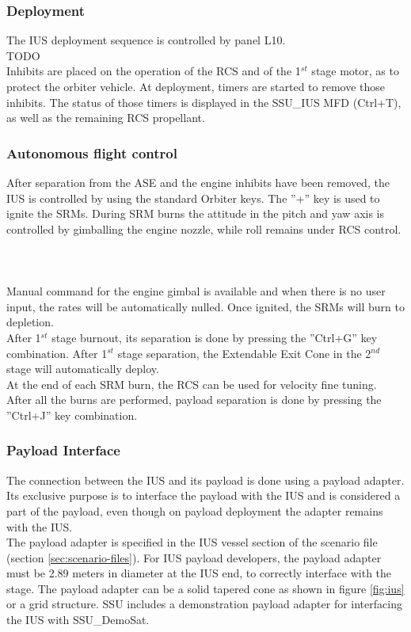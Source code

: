 \documentclass[Space_Shuttle_Ultra_Manual.tex]{subfiles}
\begin{document}
\begin{multicols*}{2}
\subsubsection{Deployment}
The IUS deployment sequence is controlled by panel L10.
\\
TODO
\\
Inhibits are placed on the operation of the RCS and of the 1$^{st}$ stage motor, as to protect the orbiter vehicle. At deployment, timers are started to remove those inhibits. The status of those timers is displayed in the SSU\_IUS MFD (Ctrl+T), as well as the remaining RCS propellant.

\subsubsection{Autonomous flight control}
After separation from the ASE and the engine inhibits have been removed, the IUS is controlled by using the standard Orbiter keys. The ''+'' key is used to ignite the SRMs. During SRM burns the attitude in the pitch and yaw axis is controlled by gimballing the engine nozzle, while roll remains under RCS control.
\\
\\
\\
\\
Manual command for the engine gimbal is available and when there is no user input, the rates will be automatically nulled. Once ignited, the SRMs will burn to depletion.\\
After 1$^{st}$ stage burnout, its separation is done by pressing the ''Ctrl+G'' key combination. After 1$^{st}$ stage separation, the Extendable Exit Cone in the 2$^{nd}$ stage will automatically deploy.\\
At the end of each SRM burn, the RCS can be used for velocity fine tuning.\\
After all the burns are performed, payload separation is done by pressing the ''Ctrl+J'' key combination.

\subsubsection{Payload Interface}
The connection between the IUS and its payload is done using a payload adapter. Its exclusive purpose is to interface the payload with the IUS and is considered a part of the payload, even though on payload deployment the adapter remains with the IUS.\\
The payload adapter is specified in the IUS vessel section of the scenario file (section \ref{sec:scenario-files}).
For IUS payload developers, the payload adapter must be 2.89 meters in diameter at the IUS end, to correctly interface with the stage. The payload adapter can be a solid tapered cone as shown in figure \ref{fig:ius} or a grid structure. SSU includes a demonstration payload adapter for interfacing the IUS with SSU\_DemoSat.\\

\end{multicols*}
\end{document}
